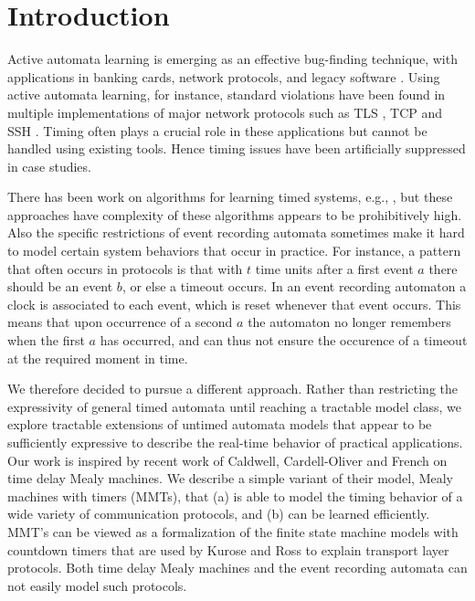 \section{Introduction}
\label{sec:intro}

Active automata learning is emerging as an effective bug-finding technique, with applications in banking cards,
network protocols, and legacy software \cite{Vaa17}.
Using active automata learning, for instance, standard violations have been found in multiple implementations of
major network protocols such as TLS \cite{dRP15}, TCP \cite{FJV16} and SSH \cite{FiterauEtAl17}.
Timing often plays a crucial role in these applications but cannot be handled using existing tools.
Hence timing issues have been artificially suppressed in case studies.

There has been work on algorithms for learning timed systems, e.g., \cite{GrinchteinJL10,MensM15,CCF16},
but these approaches have complexity of these algorithms appears to be prohibitively high.
Also the specific restrictions of event recording automata sometimes make it hard to model
certain system behaviors that occur in practice.
For instance, a pattern that often occurs in protocols is that with $t$ time units after a first event $a$
there should be an event $b$, or else a timeout occurs.
In an event recording automaton a clock is associated to each event, which is reset whenever that event occurs.
This means that upon occurrence of a second $a$ the automaton no longer remembers when the first $a$ has occurred,
and can thus not ensure the occurence of a timeout at the required moment in time.

We therefore decided to pursue a different approach. Rather than restricting the expressivity of general timed automata
until reaching a tractable model class, we explore tractable extensions of untimed automata models that appear to
be sufficiently expressive to describe the real-time behavior of practical applications.
%
Our work is inspired by recent work of Caldwell, Cardell-Oliver and French \cite{CCF16} on time delay Mealy machines.
We describe a simple variant of their model, Mealy machines with timers (MMTs), that 
(a) is able to model the timing behavior of a wide variety of communication protocols, and
(b) can be learned efficiently.
MMT's can be viewed as a formalization of the finite state machine models with countdown timers that are used by
Kurose and Ross \cite{KR13} to explain transport layer protocols.
Both time delay Mealy machines \cite{CCF16} and the event recording automata \cite{GrinchteinJL10} can not easily model such protocols.


